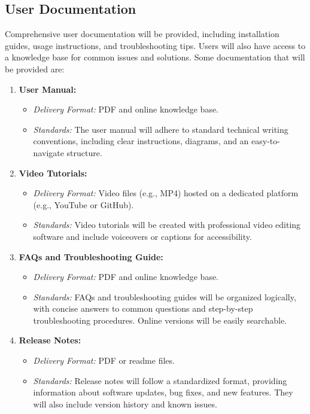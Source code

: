     \subsection{User Documentation}
        Comprehensive user documentation will be provided, including installation guides, usage instructions, and troubleshooting tips. Users will also have access to a knowledge base for common issues and solutions. Some documentation that will be provided are:
        \begin{enumerate}
                \item \textbf{User Manual:}
                    \begin{itemize}
                        \item \textit{Delivery Format:} PDF and online knowledge base.
                        \item \textit{Standards:} The user manual will adhere to standard technical writing conventions, including clear instructions, diagrams, and an easy-to-navigate structure.
                    \end{itemize}
                \item \textbf{Video Tutorials:}
                    \begin{itemize}
                        \item \textit{Delivery Format:} Video files (e.g., MP4) hosted on a dedicated platform (e.g., YouTube or GitHub).
                        \item \textit{Standards:} Video tutorials will be created with professional video editing software and include voiceovers or captions for accessibility.    
                    \end{itemize}
                \item \textbf{FAQs and Troubleshooting Guide:}
                    \begin{itemize}
                        \item \textit{Delivery Format:} PDF and online knowledge base.
                        \item \textit{Standards:} FAQs and troubleshooting guides will be organized logically, with concise answers to common questions and step-by-step troubleshooting procedures. Online versions will be easily searchable.
                    \end{itemize}
                \item \textbf{Release Notes:}
                    \begin{itemize}
                        \item \textit{Delivery Format:} PDF or readme files.
                        \item \textit{Standards:}  Release notes will follow a standardized format, providing information about software updates, bug fixes, and new features. They will also include version history and known issues.
                    \end{itemize}
            \end{enumerate}
    
